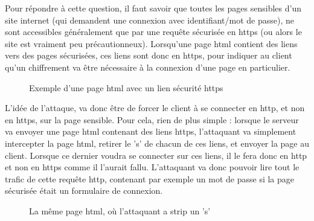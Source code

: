 Pour répondre à cette question, il faut savoir que toutes les pages sensibles d'un site internet (qui demandent une connexion avec identifiant/mot de passe), ne sont accessibles généralement que par une requête sécurisée en https (ou alors le site est vraiment peu précautionneux). Lorsqu'une page html contient des liens vers des pages sécurisées, ces liens sont donc en https, pour indiquer au client qu'un chiffrement va être nécessaire à la connexion d'une page en particulier.

\begin{figure}[H]
  \caption{Exemple d'une page html avec un lien sécurité https}
\end{figure}

L'idée de l'attaque, va donc être de forcer le client à se connecter en http, et non en https, sur la page sensible. Pour cela, rien de plus simple : lorsque le serveur va envoyer une page html contenant des liens https, l'attaquant va simplement intercepter la page html, retirer le 's' de chacun de ces liens, et envoyer la page au client. Lorsque ce dernier voudra se connecter sur ces liens, il le fera donc en http et non en https comme il l'aurait fallu. L'attaquant va donc pouvoir lire tout le trafic de cette requête http, contenant par exemple un mot de passe si la page sécurisée était un formulaire de connexion.

\begin{figure}[H]
  \caption{La même page html, où l'attaquant a strip un 's'}
\end{figure}

